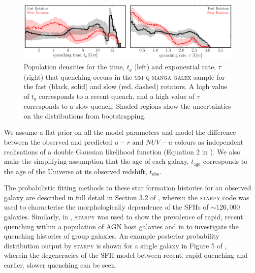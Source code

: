 \documentclass[useAMS,usenatbib]{mn2e}
\begin{document}
\begin{figure}
\centering
\includegraphics[width=\textwidth]{../figures/quenching_time_rate_FR_SR_nonkdc_MM_NSF_1sigma_C16.pdf}
\caption{Population densities for the time, $t_q$ (left) and exponential rate, $\tau$ (right) that quenching occurs in the \textsc{mm-q-manga-galex} sample for the fast (black, solid) and slow (red, dashed) rotators. A high value of $t_q$ corresponds to a recent quench, and a high value of $\tau$ corresponds to a slow quench. Shaded regions show the uncertainties on the distributions from bootstrapping. %
}
\label{fig:popfrvsr}
\end{figure}

We assume a flat prior on all the model parameters and model the difference between the observed and predicted $u-r$ and $NUV-u$ colours as independent realisations of a double Gaussian likelihood function (Equation 2 in \citealt{smethurst15}). We also make the simplifying assumption that the age of each galaxy, $t_\mathrm{age}$ corresponds to the age of the Universe at its observed redshift, $t_\mathrm{obs}$.

The probabilistic fitting methods to these star formation histories for an observed galaxy are described in full detail in Section 3.2 of \cite{smethurst15}, wherein the \textsc{starpy} code was used to characterise the morphologically dependence of the SFHs of $\sim126,000$ galaxies. Similarly, in \cite{smethurst16}, \textsc{starpy} was used to show the prevalence of rapid, recent quenching within a population of AGN host galaxies and in \cite{smethurst17} to investigate the quenching histories of group galaxies. An example posterior probability distribution output by \textsc{starpy} is shown for a single galaxy in Figure 5 of \cite{smethurst15}, wherein the degeneracies of the SFH model between recent, rapid quenching and earlier, slower quenching can be seen. 
\end{document}
